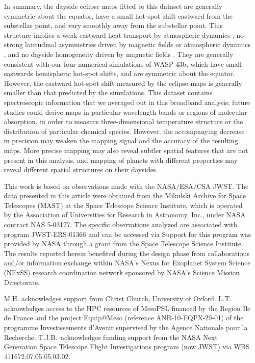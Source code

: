 \documentclass[twocolumn]{aastex631}
\begin{document}
In summary, the dayside eclipse maps fitted to this dataset are generally symmetric about the equator, have a small hot-spot shift eastward from the substellar point, and vary smoothly away from the substellar point. This structure implies a weak eastward heat transport by atmospheric dynamics \citep{hammond2021rotational}, no strong latitudinal asymmetries driven by magnetic fields or atmospheric dynamics \citep{rogers2014magnetic,skinner2022modons}, and no dayside homogeneity driven by magnetic fields \citep{beltz2021exploring}. They are generally consistent with our four numerical simulations of WASP-43b, which have small eastwards hemispheric hot-spot shifts, and are symmetric about the equator. However, the eastward hot-spot shift measured by the eclipse maps is generally smaller than that predicted by the simulations. This dataset contains spectroscopic information that we averaged out in this broadband analysis; future studies could derive maps in particular wavelength bands or regions of molecular absorption, in order to measure three-dimensional temperature structure or the distribution of particular chemical species. However, the accompanying decrease in precision may weaken the mapping signal and the accuracy of the resulting maps. More precise mapping may also reveal subtler spatial features that are not present in this analysis, and mapping of planets with different properties may reveal different spatial structures on their daysides.


\begin{acknowledgements} 
This work is based on observations made with the NASA/ESA/CSA JWST. The data presented in this article were obtained from the Mikulski Archive for Space Telescopes (MAST) at the Space Telescope Science Institute, which is operated by the Association of Universities for Research in Astronomy, Inc., under NASA contract NAS 5-03127. The specific observations analyzed are associated with program JWST-ERS-01366 and can be accessed via  Support for this program was provided by NASA through a grant from the Space Telescope Science Institute. The results reported herein benefited during the design phase from collaborations and/or information exchange within NASA’s Nexus for Exoplanet System Science (NExSS) research coordination network sponsored by NASA’s Science Mission Directorate.

M.H. acknowledges support from Christ Church, University of Oxford.
L.T. acknowledges access to the HPC resources of MesoPSL financed by the Region Ile de France and the project Equip@Meso (reference ANR-10-EQPX-29-01) of the programme Investissements d’Avenir supervised by the Agence Nationale pour la Recherche.
T.J.B.~acknowledges funding support from the NASA Next Generation Space Telescope Flight Investigations program (now JWST) via WBS 411672.07.05.05.03.02. 
\end{acknowledgements} 
\end{document}
